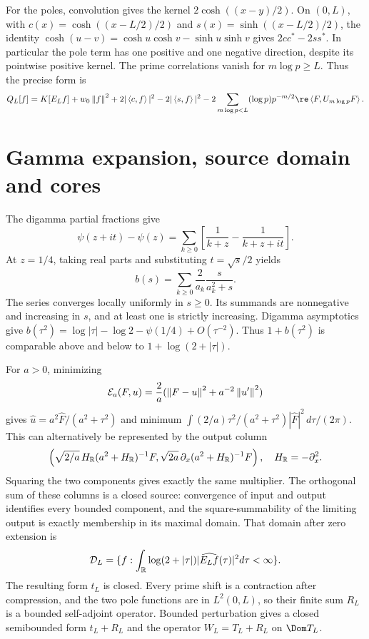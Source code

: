 For the poles, convolution gives the kernel $2\cosh((x-y)/2)$.
On $(0,L)$, with $c(x)=\cosh((x-L/2)/2)$ and
$s(x)=\sinh((x-L/2)/2)$, the identity
$\cosh(u-v)=\cosh u\cosh v-\sinh u\sinh v$ gives
$2cc^*-2ss^*$. In particular the pole term has one positive and one
negative direction, despite its pointwise positive kernel.
The prime correlations vanish for $m\log p\ge L$. Thus the precise
form is
\begin{equation}\label{d:full-form}
Q_L[f]=K[E_Lf]+w_0\norm f^2+2|\ip c f|^2-2|\ip s f|^2
-2\sum_{m\log p<L}(\log p)p^{-m/2}\re\ip F{U_{m\log p}F}.
\end{equation}

\section{Gamma expansion, source domain and cores}
The digamma partial fractions \cite{DLMF} give
\[
\psi(z+it)-\psi(z)=\sum_{k\ge0}
\left[\frac1{k+z}-\frac1{k+z+it}\right].
\]
At $z=1/4$, taking real parts and substituting $t=\sqrt{s}/2$ yields
\begin{equation}\label{d:gamma-series}
b(s)=\sum_{k\ge0}\frac2{a_k}\frac{s}{a_k^2+s}.
\end{equation}
The series converges locally uniformly in $s\ge0$. Its summands are
nonnegative and increasing in $s$, and at least one is strictly increasing.
Digamma asymptotics give
$b(\tau^2)=\log|\tau|-\log2-\psi(1/4)+O(\tau^{-2})$.
Thus $1+b(\tau^2)$ is comparable above and below to
$1+\log(2+|\tau|)$.

For $a>0$, minimizing
\[
\mathcal E_a(F,u)=\frac2a(\left\lVert F-u\right\rVert^2+a^{-2}\left\lVert u'\right\rVert^2)
\]
gives $\widehat u=a^2\widehat F/(a^2+\tau^2)$ and minimum
$\int (2/a)\tau^2/(a^2+\tau^2)|\widehat F|^2\,d\tau/(2\pi)$.
This can alternatively be represented by the output column
\[
\left(\sqrt{2/a}\,H_\mathbb R(a^2+H_\mathbb R)^{-1}F,
\sqrt{2a}\,\partial_x(a^2+H_\mathbb R)^{-1}F\right),\quad H_\mathbb R=-\partial_x^2.
\]
Squaring the two components gives exactly the same multiplier. The
orthogonal sum of these columns is a closed source: convergence of input
and output identifies every bounded component, and the square-summability
of the limiting output is exactly membership in its maximal domain.
That domain after zero extension is
\begin{equation}\label{d:domain}
\mathcal D_L=\{f:\int_\mathbb R\log(2+|\tau|)|\widehat{E_Lf}(\tau)|^2d\tau<\infty\}.
\end{equation}
The resulting form $t_L$ is closed. Every prime shift is a contraction
after compression, and the two pole functions are in $L^2(0,L)$, so their
finite sum $R_L$ is a bounded self-adjoint operator. Bounded perturbation
gives a closed semibounded form $t_L+R_L$ and the operator
$W_L=T_L+R_L$ on $\Dom T_L$.

